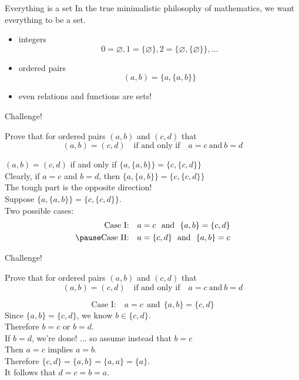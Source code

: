 \documentclass{beamer}
\begin{document}
\begin{frame}{Everything is a set}
In the true minimalistic philosophy of mathematics, we want everything to be a set.
\begin{itemize}
\pause
\item integers
\pause
$$0 = \varnothing, 1 = \{\varnothing\}, 2 = \{\varnothing,\{\varnothing\}\},\dots$$
\pause
\item ordered pairs
\pause
$$(a,b) = \{a,\{a,b\}\}$$
\pause
\item even relations and functions are sets!
\end{itemize}
\end{frame}

\begin{frame}{Challenge!}
\begin{prob}
Prove that for ordered pairs $(a,b)$ and $(c,d)$ that
$$(a,b)=(c,d)\quad\text{if and only if}\quad a=c\ \text{and}\ b=d$$
\end{prob}
\pause
\begin{soln}
$(a,b)=(c,d)$ if and only if $\{a,\{a,b\}\}=\{c,\{c,d\}\}$\\
\pause
Clearly, if $a=c$ and $b=d$, then $\{a,\{a,b\}\}=\{c,\{c,d\}\}$\\
\pause
The tough part is the opposite direction!\\
\pause
Suppose $\{a,\{a,b\}\}=\{c,\{c,d\}\}$.\\
\pause
Two possible cases:
\pause
\begin{align*}
\text{Case I:}\quad a=c\ \ \text{and}\ \  \{a,b\} = \{c,d\}\\
\pause
\text{Case II:}\quad a=\{c,d\}\ \ \text{and}\ \ \{a,b\} = c
\end{align*}
\end{soln}
\end{frame}

\begin{frame}{Challenge!}
\begin{prob}
Prove that for ordered pairs $(a,b)$ and $(c,d)$ that
$$(a,b)=(c,d)\quad\text{if and only if}\quad a=c\ \text{and}\ b=d$$
\end{prob}
\begin{soln}
$$\text{Case I:}\quad a=c\ \ \text{and}\ \  \{a,b\} = \{c,d\}$$
\pause
Since $\{a,b\} = \{c,d\}$, we know $b\in \{c,d\}$.\\
\pause
Therefore $b=c$ or $b=d$.\\
If $b=d$, we're done! \pause ... so assume instead that $b=c$\\
\pause
Then $a=c$ implies $a=b$.\\
\pause
Therefore $\{c,d\} = \{a,b\} = \{a,a\} = \{a\}$.\\
\pause
It follows that $d=c=b=a$.
\end{soln}
\end{frame}
\end{document}
